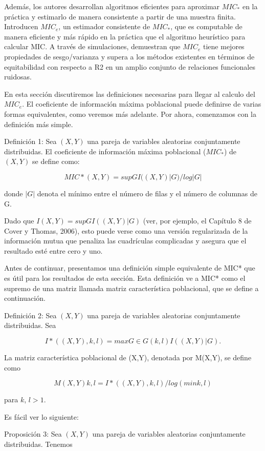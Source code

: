 	Adem\'as, los autores desarrollan algoritmos eficientes para aproximar $MIC_*$ en la pr\'actica y estimarlo de manera consistente a partir de una muestra finita. Introducen $MIC_e$, un estimador consistente de $MIC_*$, que es computable de manera eficiente y m\'as r\'apido en la pr\'actica que el algoritmo heur\'istico para calcular MIC. A trav\'es de simulaciones, demuestran que $MIC_e$ tiene mejores propiedades de sesgo/varianza y supera a los m\'etodos existentes en t\'erminos de equitabilidad con respecto a R2 en un amplio conjunto de relaciones funcionales ruidosas.

	En esta secci\'on discutiremos las definiciones necesarias para llegar al calculo del $MIC_e$. El coeficiente de informaci\'on m\'axima poblacional puede definirse de varias formas equivalentes, como veremos m\'as adelante. Por ahora, comenzamos con la definici\'on m\'as simple.

	Definici\'on 1: Sea $(X,Y)$ una pareja de variables aleatorias conjuntamente distribuidas. El coeficiente de informaci\'on m\'axima poblacional ($MIC_*$) de $(X,Y)$ se define como:
	
	$$MIC*(X,Y) = sup G I((X,Y)|G) / log |G|$$
	
	donde $|G|$ denota el m\'inimo entre el n\'umero de filas y el n\'umero de columnas de G.
	
	Dado que $I(X,Y) = supG I((X,Y)|G)$ (ver, por ejemplo, el Cap\'itulo 8 de Cover y Thomas, 2006), esto puede verse como una versi\'on regularizada de la informaci\'on mutua que penaliza las cuadr\'iculas complicadas y asegura que el resultado est\'e entre cero y uno.
	
	Antes de continuar, presentamos una definici\'on simple equivalente de MIC* que es \'util para los resultados de esta secci\'on. Esta definici\'on ve a MIC* como el supremo de una matriz llamada matriz caracter\'istica poblacional, que se define a continuaci\'on.
	
	Definici\'on 2: Sea $(X,Y)$ una pareja de variables aleatorias conjuntamente distribuidas. Sea
	
	$$I*((X,Y),k,l) = max G\in G(k,l) I((X,Y)|G).$$
	
	La matriz caracter\'istica poblacional de (X,Y), denotada por M(X,Y), se define como
	
	$$M(X,Y)k,l = I*((X,Y),k,l) / log(min{k,l})$$
	
	para $k$, $l > 1$.
	
	Es f\'acil ver lo siguiente:
	
	Proposici\'on 3: Sea $(X,Y)$ una pareja de variables aleatorias conjuntamente distribuidas. Tenemos
	
